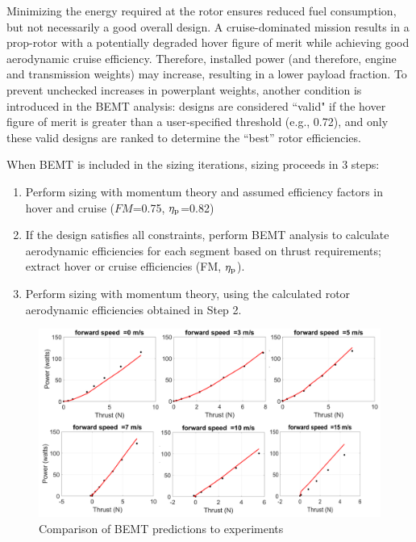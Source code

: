 Minimizing the energy required at the rotor ensures reduced fuel consumption, but not necessarily a good overall design. A cruise-dominated mission results in a prop-rotor with a potentially degraded hover figure of merit while achieving good aerodynamic cruise efficiency. Therefore, installed power (and therefore, engine and transmission weights) may increase, resulting in a lower payload fraction. To prevent unchecked increases in powerplant weights, another condition is introduced in the BEMT analysis: designs are considered ``valid" if the hover figure of merit is greater than a user-specified threshold (e.g., 0.72), and only these valid designs are ranked to determine the ``best'' rotor efficiencies.

When BEMT is included in the sizing iterations, sizing proceeds in 3 steps:
\begin{enumerate}
\item Perform sizing with momentum theory and assumed efficiency factors in hover and cruise ($FM$=0.75, $\eta_{\rm p}$=0.82)
\item If the design satisfies all constraints, perform BEMT analysis to calculate aerodynamic efficiencies for each segment based on thrust requirements; extract hover or cruise efficiencies (FM, $\eta_{\rm p}$).
\item Perform sizing with momentum theory, using the calculated rotor aerodynamic efficiencies obtained in Step 2.
\end{enumerate}


\begin{figure}
\centering    
\includegraphics[width=\textwidth]{images/bemt_validation.png}
\vspace{-1cm}
\caption{Comparison of BEMT predictions to experiments}
\label{fig:bemt}
\end{figure}

